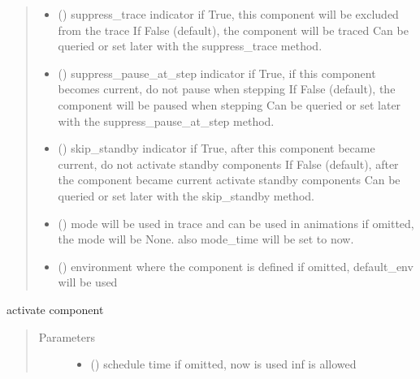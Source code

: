\documentclass[letterpaper,10pt,english]{sphinxmanual}
\begin{document}
\begin{fulllineitems}
\begin{quote}
\begin{description}
\begin{itemize}
\item {} 
 () \textendash{} suppress\_trace indicator 
if True, this component will be excluded from the trace 
If False (default), the component will be traced 
Can be queried or set later with the suppress\_trace method.

\item {} 
 () \textendash{} suppress\_pause\_at\_step indicator 
if True, if this component becomes current, do not pause when stepping 
If False (default), the component will be paused when stepping 
Can be queried or set later with the suppress\_pause\_at\_step method.

\item {} 
 () \textendash{} skip\_standby indicator 
if True, after this component became current, do not activate standby components 
If False (default), after the component became current  activate standby components 
Can be queried or set later with the skip\_standby method.

\item {} 
 () \textendash{} mode 
will be used in trace and can be used in animations 
if omitted, the mode will be None. 
also mode\_time will be set to now.

\item {} 
 ({\hyperref[\detokenize{Reference:salabim.Environment}]{}}) \textendash{} environment where the component is defined 
if omitted, default\_env will be used

\end{itemize}

\end{description}\end{quote}

\begin{fulllineitems}
\label{\detokenize{Reference:salabim.Component.activate}}
activate component
\begin{quote}\begin{description}
\item[{Parameters}] \leavevmode\begin{itemize}
\item {} 
 () \textendash{} schedule time 
if omitted, now is used 
inf is allowed


\end{itemize}
\end{description}
\end{quote}
\end{fulllineitems}
\end{fulllineitems}
\end{document}
